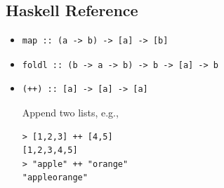 \documentclass[addpoints]{exam}
\begin{document}
\begin{questions}

\end{questions}

\newpage

\subsection*{Haskell Reference}

\begin{itemize}
\item
\begin{verbatim}
map :: (a -> b) -> [a] -> [b]
\end{verbatim}

\item
\begin{verbatim}
foldl :: (b -> a -> b) -> b -> [a] -> b
\end{verbatim}

\item
\begin{verbatim}
(++) :: [a] -> [a] -> [a]
\end{verbatim}
Append two lists, e.g.,
\begin{verbatim}
> [1,2,3] ++ [4,5]
[1,2,3,4,5]
> "apple" ++ "orange"
"appleorange"
\end{verbatim}
\end{itemize}
\end{document}

